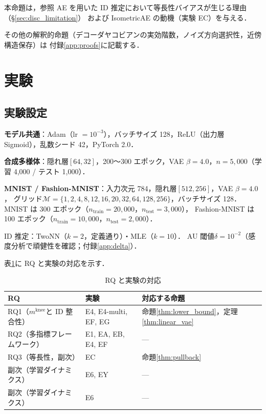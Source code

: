 \documentclass[11pt,a4paper]{jsarticle}
\newcommand{\mknee}{m^{\mathrm{knee}}}
\begin{document}
本命題は，参照 AE を用いた ID 推定において等長性バイアスが生じる理由（§\ref{sec:disc_limitation}）
および IsometricAE の動機（実験 EC）を与える．

その他の解釈的命題（デコーダヤコビアンの実効階数，ノイズ方向選択性，近傍構造保存）は
付録\ref{app:proofs}に記載する．

\section{実験}\label{sec:exp}

\subsection{実験設定}\label{sec:exp_setup}

\textbf{モデル共通}：Adam（lr $= 10^{-3}$），バッチサイズ 128，ReLU（出力層 Sigmoid），乱数シード 42，PyTorch 2.0．

\textbf{合成多様体}：隠れ層$[64, 32]$，200〜300 エポック，VAE $\beta = 4.0$，$n = 5{,}000$（学習 4,000 / テスト 1,000）．

\textbf{MNIST / Fashion-MNIST}：入力次元 784，隠れ層$[512, 256]$，VAE $\beta = 4.0$，
グリッド$\mathcal{M} = \{1,2,4,8,12,16,20,32,64,128,256\}$，バッチサイズ 128．
MNIST は 300 エポック（$n_{\mathrm{train}} = 20{,}000$，$n_{\mathrm{test}} = 3{,}000$），
Fashion-MNIST は 100 エポック（$n_{\mathrm{train}} = 10{,}000$，$n_{\mathrm{test}} = 2{,}000$）．

ID 推定：TwoNN（$k=2$，定義通り）・MLE（$k=10$）\cite{facco2017twonn,levina2005mle}．
AU 閾値$\delta = 10^{-2}$\cite{lucas2019elbo}（感度分析で頑健性を確認；付録\ref{app:delta}）．

表\ref{tab:rq_exp_map}に RQ と実験の対応を示す．

\begin{table}[H]
\centering
\caption{RQ と実験の対応}
\label{tab:rq_exp_map}
\small
\begin{tabular}{lll}
\toprule
RQ & 実験 & 対応する命題 \\
\midrule
RQ1（$\mknee$と ID 整合性） & E4, E4-multi, EF, EG & 命題\ref{thm:lower_bound}，定理\ref{thm:linear_vae} \\
RQ2（多指標フレームワーク） & E1, EA, EB, E4, EF & --- \\
RQ3（等長性，副次） & EC & 命題\ref{thm:pullback} \\
副次（学習ダイナミクス） & E6, EY & --- \\
副次（学習ダイナミクス） & E6 & --- \\
\bottomrule
\end{tabular}
\end{table}
\end{document}
